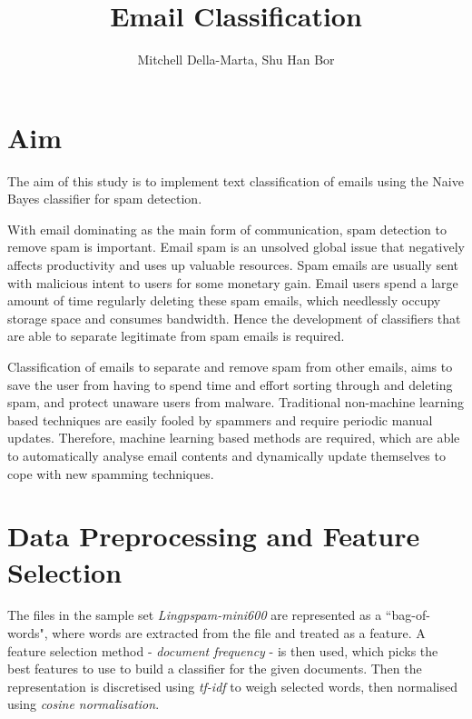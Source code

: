 \documentclass[10pt, a4paper]{article}
\title{Email Classification}
\author{Mitchell Della-Marta, Shu Han Bor}
\date{}
\begin{document}
\maketitle

\section{Aim}

The aim of this study is to implement text classification of emails using the Naive Bayes classifier for spam detection.

With email dominating as the main form of communication, spam detection to remove spam is important. Email spam is an unsolved global issue that negatively affects productivity and uses up valuable resources. Spam emails are usually sent with malicious intent to users for some monetary gain. Email users spend a large amount of time regularly deleting these spam emails, which needlessly occupy storage space and consumes bandwidth. Hence the development of classifiers that are able to separate legitimate from spam emails is required.

Classification of emails to separate and remove spam from other emails, aims to save the user from having to spend time and effort sorting through and deleting spam, and protect unaware users from malware. Traditional non-machine learning based techniques are easily fooled by spammers and require periodic manual updates. Therefore, machine learning based methods are required, which are able to automatically analyse email contents and dynamically update themselves to cope with new spamming techniques.

\section{Data Preprocessing and Feature Selection}
The files in the sample set \emph{Lingpspam-mini600} are represented as a ``bag-of-words", where words are extracted from the file and treated as a feature. A feature selection method - \emph{document frequency} - is then used, which picks the best features to use to build a classifier for the given documents. Then the representation is discretised using \emph{tf-idf} to weigh selected words, then normalised using \emph{cosine normalisation}.
\end{document}
